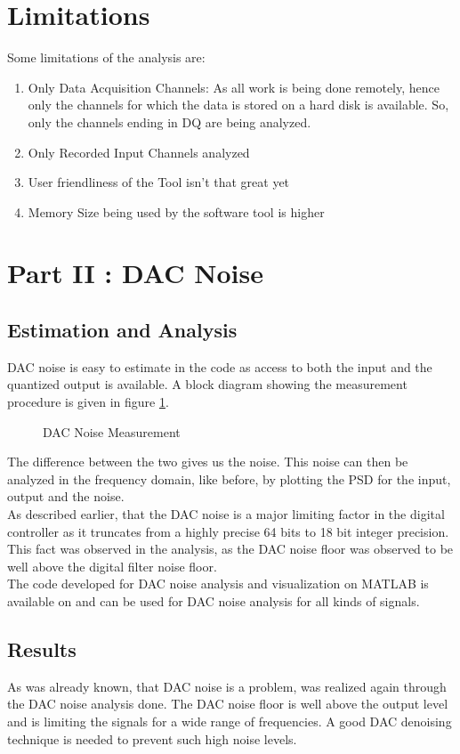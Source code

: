 \documentclass[colorlinks=true,pdfstartview=FitV,linkcolor=blue,
            citecolor=red,urlcolor=magenta]{ligodoc}
\begin{document}
	\section{Limitations}
	Some limitations of the analysis are:
		\begin{enumerate}
			\item Only Data Acquisition Channels: As all work is being done remotely, hence only the channels for which the data is stored on a hard disk is available. So, only the channels ending in \textunderscore DQ are being analyzed.
			\item Only Recorded Input Channels analyzed
			\item User friendliness of the Tool isn't that great yet
			\item Memory Size being used by the software tool is higher
		\end{enumerate}	
\section{Part II : DAC Noise}
	\subsection{Estimation and Analysis}
		DAC noise is easy to estimate in the code as access to both the input and the quantized output is available. A block diagram showing the measurement procedure is given in figure \ref{mea}.
		\begin{figure}[H]

  		\centering
  		\def\svgscale{0.5}
  		\tiny{
  		
  		}
  		\caption{DAC Noise Measurement}
		\label{mea}
		\end{figure}
		The difference between the two gives us the noise. This noise can then be analyzed in the frequency domain, like before, by plotting the PSD for the input, output and the noise. \\As described earlier, that the DAC noise is a major limiting factor in the digital controller as it truncates from a highly precise 64 bits to 18 bit integer precision. This fact was observed in the analysis, as the DAC noise floor was observed to be well above the digital filter noise floor. 
		\\The code developed for DAC noise analysis and visualization on MATLAB is available on \cite{Git} and can be used for DAC noise analysis for all kinds of signals. 
    \subsection{Results}
    As was already known, that DAC noise is a problem, was realized again through the DAC noise analysis done. The DAC noise floor is well above the output level and is limiting the signals for a wide range of frequencies. A good DAC denoising technique is needed to prevent such high noise levels. 
\end{document}
